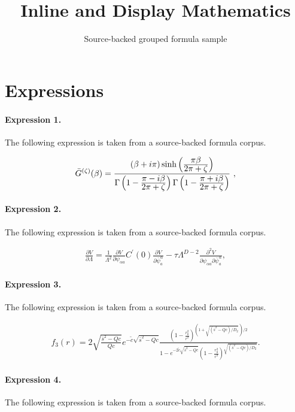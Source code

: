 \documentclass[11pt]{article}
\title{Inline and Display Mathematics}
\author{Source-backed grouped formula sample}
\date{}
\begin{document}
\maketitle
\section{Expressions}
\paragraph{Expression 1.} The following expression is taken from a source-backed formula corpus.

\begin{align*}{\bar G}^{(\zeta )}(\beta )={(\beta +i\pi )\sinh\left( {\displaystyle \pi\beta\over \displaystyle 2\pi +\zeta}\right) \over\Gamma \left( 1- {\displaystyle\pi-i\beta \over \displaystyle 2\pi+\zeta}\right)\Gamma \left( 1- {\displaystyle\pi+i\beta \over \displaystyle 2\pi+\zeta}\right)}\ ,\end{align*}

\paragraph{Expression 2.} The following expression is taken from a source-backed formula corpus.

\begin{align*}\frac{\partial V}{\partial \Lambda}=\frac{1}{\Lambda^{2}}\frac{\partial V}{\partial\psi^{\phantom{a}}_{\alpha a}}C^{\prime}(0)\frac{\partial V}{\partial\bar{\psi}_{a}^{\alpha}}-\tau\Lambda^{D-2}\frac{\partial^{2}V}{\partial\psi^{\phantom{a}}_{\alpha a}\partial\bar{\psi}_{a}^{\alpha}},\end{align*}

\paragraph{Expression 3.} The following expression is taken from a source-backed formula corpus.

\begin{align*}f_3 (r) = 2 \sqrt{\frac{\bar{s}^2 - Qc}{Qc} } e^{- \tilde{c} \sqrt{\bar{s}^2 - Qc}}\frac{ \left( 1 - \frac{r_0^2}{r^2} \right)^{(1 + \sqrt{(\bar{s}^2 - Qc)/D_2} \ ) /2} } {1- e^{-2 \tilde{c} \sqrt{\bar{s}^2 - Qc}} \left( 1 - \frac{r_0^2}{r^2} \right)^{\sqrt{(\bar{s}^2 - Qc)/D_2}} } . \end{align*}

\paragraph{Expression 4.} The following expression is taken from a source-backed formula corpus.
\end{document}
